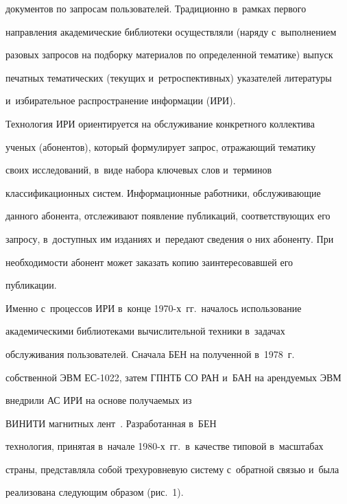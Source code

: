 документов по запросам пользователей. Традиционно в~рамках первого 


направления академические библиотеки осуществляли (наряду с~выполнением 


разовых запросов на подборку материалов по определенной тематике) выпуск 


печатных тематических (текущих и~ретроспективных) указателей литературы 


и~избирательное распространение информации (ИРИ). 


  


  Технология ИРИ ориентируется на обслуживание конкретного коллектива 


ученых (абонентов), который формулирует запрос, отражающий тематику 


своих исследований, в~виде набора ключевых слов и~терминов 


классификационных систем. Информационные работники, обслуживающие 


данного абонента, отслеживают появление публикаций, соответствующих его 


запросу, в~доступных им изданиях и~передают сведения о них абоненту. При 


необходимости абонент может заказать копию заинтересовавшей его 


публикации.


  


  Именно с~процессов ИРИ в~конце 1970-х~гг.\ началось использование 


академическими библиотеками вычислительной техники в~задачах 


обслуживания пользователей. Сначала БЕН на полученной в~1978~г.\ 


собственной ЭВМ ЕС-1022, затем ГПНТБ СО РАН и~БАН на арендуемых ЭВМ 


внедрили АС ИРИ на основе получаемых из 


ВИНИТИ магнитных лент~\cite{11-vla, 12-vla}. Разработанная в~БЕН 


технология, принятая в~начале 1980-х~гг.\ в~качестве типовой в~масштабах 


страны, представляла собой трехуровневую систему с~обратной связью и~была 


реализована следующим образом (рис.~1). 


  


